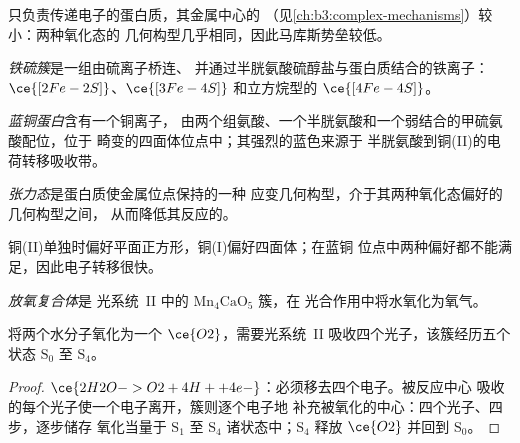 只负责传递电子的蛋白质，其金属中心的
（见\cref{ch:b3:complex-mechanisms}）较小：两种氧化态的
几何构型几乎相同，因此马库斯势垒较低。

\begin{definition}[铁硫簇]\label{def:b3:bioinorganic:fes}
\emph{铁硫簇}是一组由硫离子桥连、
并通过半胱氨酸硫醇盐与蛋白质结合的铁离子：
$\ce{[2Fe-2S]}$、$\ce{[3Fe-4S]}$ 和立方烷型的 $\ce{[4Fe-4S]}$。
\end{definition}

\begin{definition}[蓝铜蛋白]\label{def:b3:bioinorganic:blue-copper}
\emph{蓝铜蛋白}含有一个铜离子，
由两个组氨酸、一个半胱氨酸和一个弱结合的甲硫氨酸配位，位于
畸变的四面体位点中；其强烈的蓝色来源于
半胱氨酸到铜(II)的电荷转移吸收带。
\end{definition}

\begin{definition}[张力态]\label{def:b3:bioinorganic:entatic}
\emph{张力态}是蛋白质使金属位点保持的一种
应变几何构型，介于其两种氧化态偏好的几何构型之间，
从而降低其反应的。
\end{definition}

铜(II)单独时偏好平面正方形，铜(I)偏好四面体；在蓝铜
位点中两种偏好都不能满足，因此电子转移很快。

\begin{definition}[放氧复合体]\label{def:b3:bioinorganic:oec}
\emph{放氧复合体}是
光系统~II 中的 $\mathrm{Mn_4CaO_5}$ 簇，在
光合作用中将水氧化为氧气。
\end{definition}

\begin{proposition}[每个氧需四个光子]\label{prop:b3:bioinorganic:kok}
将两个水分子氧化为一个 $\ce{O2}$，需要光系统~II
吸收四个光子，该簇经历五个状态 $\mathrm S_0$ 至 $\mathrm S_4$。
\end{proposition}

\begin{proof}
$\ce{2H2O -> O2 + 4H+ + 4e-}$：必须移去四个电子。被反应中心
吸收的每个光子使一个电子离开，簇则逐个电子地
补充被氧化的中心：四个光子、四步，逐步储存
氧化当量于 $\mathrm S_1$ 至 $\mathrm S_4$ 诸状态中；$\mathrm S_4$ 释放 $\ce{O2}$ 并回到 $\mathrm S_0$。
\end{proof}

